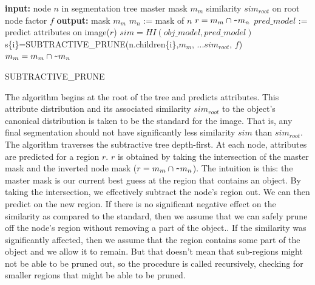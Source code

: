 \documentclass[10pt,twocolumn,letterpaper]{article}
\begin{document}
\begin{algorithm}
\begin{algorithmic}
  \STATE \textbf{input:}
  \STATE \hspace{3 mm} node $n$ in segmentation tree
  \STATE \hspace{3 mm} master mask $m_m$
  \STATE \hspace{3 mm} similarity $sim_{root}$ on root node
  \STATE \hspace{3 mm} factor $f$
  \STATE \textbf{output:}
  \STATE \hspace{3 mm} mask $m_m$
  \STATE
  \STATE $m_n$ := mask of $n$
  \STATE $r = m_{m} \cap \verb+~+ m_{n}$
  \STATE $pred\_model$ := predict attributes on image($r$)
  \STATE $sim=HI(obj\_model,pred\_model)$
      \STATE s\{i\}=SUBTRACTIVE\_PRUNE(n.children\{i\},$m_m$,
      \STATE ...$sim_{root}$, $f$)
    \ENDFOR
  \ELSE
    \STATE $m_m = m_m \cap \verb+~+ m_n$
  \ENDIF
\end{algorithmic}
\caption{SUBTRACTIVE\_PRUNE}
\label{alg:sub_prune}
\end{algorithm}

The algorithm begins at the root of the tree and predicts attributes.
This attribute distribution and its associated similarity $sim_{root}$
to the object's canonical distribution is taken to be
the standard for the image.  That is, any final segmentation should not have
significantly less similarity $sim$ than $sim_{root}$.  The algorithm traverses
the subtractive tree depth-first.  At each node, attributes are predicted for 
a region $r$.  
$r$ is obtained by taking the intersection of the master mask and the inverted
node mask ($r = m_{m} \cap \verb+~+ m_{n}$).  The intuition is this: the master mask is our current best guess at
the region that contains an object.  By taking the intersection, we effectively
subtract the node's region out.
We can then predict on the new region.  If 
there is no significant negative effect on the similarity as
compared to the standard, then we assume that we can safely prune off the node's
region without removing a part of the object..  If the
similarity was significantly affected, then we assume that the region
contains some part of the object and we allow it to remain.  But that 
doesn't mean that sub-regions might not be able to be pruned
out, so the procedure is called recursively, checking for smaller regions
that might be able to be pruned.
\end{document}
